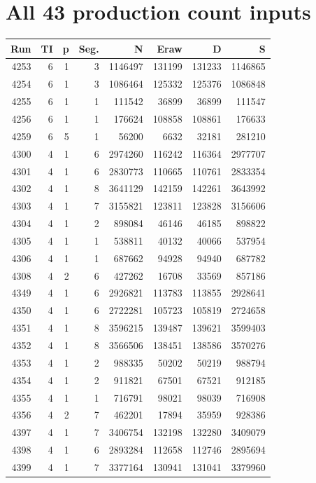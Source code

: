 \section{All 43 production count inputs}
\small\begin{longtable}{rrrrrrrr}\toprule Run & TI & p & Seg. & N & Eraw & D & S\\\midrule\endhead
4253 & 6 & 1 & 3 & 1146497 & 131199 & 131233 & 1146865\\
4254 & 6 & 1 & 3 & 1086464 & 125332 & 125376 & 1086848\\
4255 & 6 & 1 & 1 & 111542 & 36899 & 36899 & 111547\\
4256 & 6 & 1 & 1 & 176624 & 108858 & 108861 & 176633\\
4259 & 6 & 5 & 1 & 56200 & 6632 & 32181 & 281210\\
4300 & 4 & 1 & 6 & 2974260 & 116242 & 116364 & 2977707\\
4301 & 4 & 1 & 6 & 2830773 & 110665 & 110761 & 2833354\\
4302 & 4 & 1 & 8 & 3641129 & 142159 & 142261 & 3643992\\
4303 & 4 & 1 & 7 & 3155821 & 123811 & 123828 & 3156606\\
4304 & 4 & 1 & 2 & 898084 & 46146 & 46185 & 898822\\
4305 & 4 & 1 & 1 & 538811 & 40132 & 40066 & 537954\\
4306 & 4 & 1 & 1 & 687662 & 94928 & 94940 & 687782\\
4308 & 4 & 2 & 6 & 427262 & 16708 & 33569 & 857186\\
4349 & 4 & 1 & 6 & 2926821 & 113783 & 113855 & 2928641\\
4350 & 4 & 1 & 6 & 2722281 & 105723 & 105819 & 2724658\\
4351 & 4 & 1 & 8 & 3596215 & 139487 & 139621 & 3599403\\
4352 & 4 & 1 & 8 & 3566506 & 138451 & 138586 & 3570276\\
4353 & 4 & 1 & 2 & 988335 & 50202 & 50219 & 988794\\
4354 & 4 & 1 & 2 & 911821 & 67501 & 67521 & 912185\\
4355 & 4 & 1 & 1 & 716791 & 98021 & 98039 & 716908\\
4356 & 4 & 2 & 7 & 462201 & 17894 & 35959 & 928386\\
4397 & 4 & 1 & 7 & 3406754 & 132198 & 132280 & 3409079\\
4398 & 4 & 1 & 6 & 2893284 & 112658 & 112746 & 2895694\\
4399 & 4 & 1 & 7 & 3377164 & 130941 & 131041 & 3379960\\

\end{longtable}
